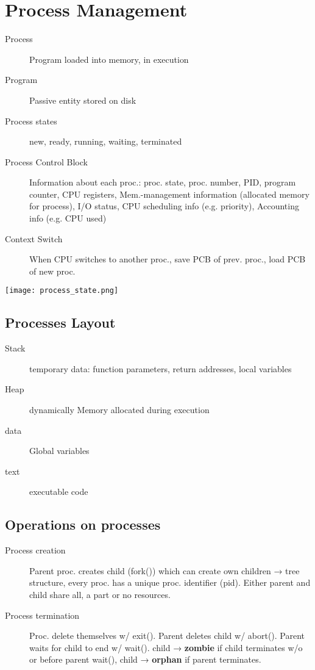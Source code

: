 \section*{Process Management}
\begin{description}
  \item[Process] Program loaded into memory, in execution
  \item[Program] Passive entity stored on disk
  \item[Process states] new, ready, running, waiting, terminated
  \item[Process Control Block] Information about each proc.: proc. state, proc. number, PID, program counter, CPU registers, Mem.-management information (allocated memory for process), I/O status, CPU scheduling info (e.g. priority), Accounting info (e.g. CPU used)
  \item[Context Switch] When CPU switches to another proc., save PCB of prev. proc., load PCB of new proc.
\end{description}

\texttt{[image: process\_state.png]}
\subsection*{Processes Layout}
\begin{description}
  \item[Stack] temporary data: function parameters, return addresses, local variables
  \item[Heap] dynamically Memory allocated during execution
  \item[data] Global variables 
  \item[text] executable code
\end{description}


\subsection*{Operations on processes}
\begin{description}
  \item[Process creation]Parent proc. creates child (fork()) which can create own children → tree structure, every proc. has a unique proc. identifier (pid). Either parent and child share all, a part or no resources.
  \item[Process termination] Proc. delete themselves w/ exit(). Parent deletes child w/ abort(). Parent waits for child to end w/ wait(). child → \textbf{zombie} if child terminates w/o or before parent wait(), child → \textbf{orphan} if parent terminates.
\end{description}

